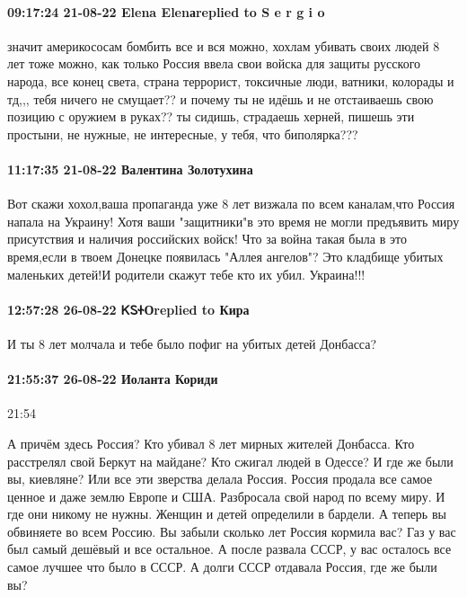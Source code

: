 \paragraph{09:17:24 21-08-22 Elena Elenаreplied to S e r g i o}

значит америкососам бомбить все и вся можно, хохлам убивать своих людей 8 лет
тоже можно, как только Россия ввела свои войска для защиты русского народа, все
конец света, страна террорист, токсичные люди, ватники, колорады и тд,,, тебя
ничего не смущает?? и почему ты не идёшь и не отстаиваешь свою позицию с
оружием в руках?? ты сидишь, страдаешь херней, пишешь эти простыни, не нужные,
не интересные, у тебя, что биполярка???

\paragraph{11:17:35 21-08-22 Валентина Золотухина}

Вот скажи хохол,ваша пропаганда уже 8 лет визжала по всем каналам,что Россия
напала на Украину! Хотя ваши "защитники"в это время не могли предъявить миру
присутствия и наличия российских войск! Что за война такая была в это
время,если в твоем Донецке появилась "Аллея ангелов"? Это кладбище убитых
маленьких детей!И родители скажут тебе кто их убил. Украина!!!

\paragraph{12:57:28 26-08-22 ᏦᏚᏐОreplied to Кира}

И ты 8 лет молчала и тебе было пофиг на убитых детей Донбасса?

\paragraph{21:55:37 26-08-22 Иоланта Кориди}
21:54

А причём здесь Россия? Кто убивал 8 лет мирных жителей Донбасса. Кто расстрелял
свой Беркут на майдане? Кто сжигал людей в Одессе? И где же были вы, киевляне?
Или все эти зверства делала Россия. Россия продала все самое ценное и даже
землю Европе и США. Разбросала свой народ по всему миру. И где они никому не
нужны. Женщин и детей определили в бардели. А теперь вы обвиняете во всем
Россию. Вы забыли сколько лет Россия кормила вас? Газ у вас был самый дешёвый и
все остальное. А после развала СССР, у вас осталось все самое лучшее что было в
СССР. А долги СССР отдавала Россия, где же были вы?


